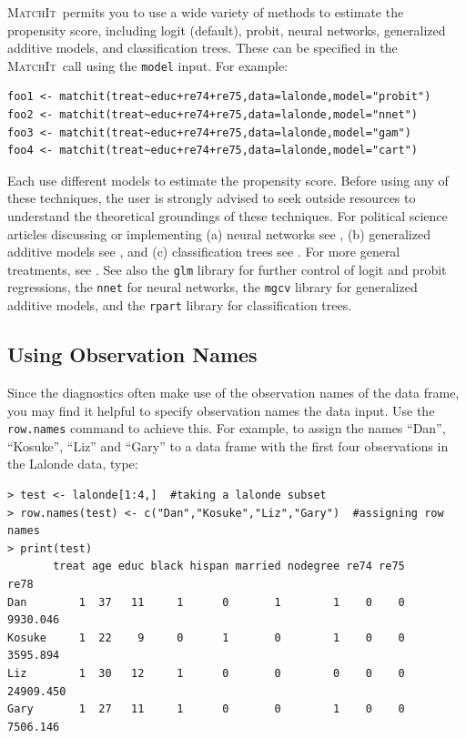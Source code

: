 \documentclass[oneside,letterpaper,titlepage]{article}
\newcommand{\MatchIt}{\textsc{MatchIt}}
\begin{document}
\MatchIt\ permits you to use a wide variety of methods to
estimate the propensity score, including logit (default), probit,
neural networks, generalized additive models, and classification
trees.  These can be specified in the \MatchIt\ call using the
\texttt{model} input.  For example:

\begin{verbatim}
foo1 <- matchit(treat~educ+re74+re75,data=lalonde,model="probit")
foo2 <- matchit(treat~educ+re74+re75,data=lalonde,model="nnet")
foo3 <- matchit(treat~educ+re74+re75,data=lalonde,model="gam")
foo4 <- matchit(treat~educ+re74+re75,data=lalonde,model="cart")
\end{verbatim}

Each use different models to estimate the propensity score.  Before
using any of these techniques, the user is strongly advised to seek
outside resources to understand the theoretical groundings of these
techniques.  For political science articles discussing or implementing
(a) neural networks see \citet{BecKinZen00,Zeng99,Zeng00,LagRus02}, (b)
generalized additive models see \citet{BecJac98}, and (c)
classification trees see \citet{RugKimMar03}.  For more general
treatments, see \citet{Bishop95,White92,BreFriOls84}.  See also the
\texttt{glm} library for further control of logit and probit
regressions, the \texttt{nnet} for neural networks, the \texttt{mgcv}
library for generalized additive models, and the \texttt{rpart}
library for classification trees.

\subsection{Using Observation Names}
\label{rnames}

Since the diagnostics often make use of the observation names of the
data frame, you may find it helpful to specify observation names the
data input.  Use the \texttt{row.names} command to achieve this.  For
example, to assign the names ``Dan'', ``Kosuke'', ``Liz'' and ``Gary''
to a data frame with the first four observations in the Lalonde data,
type:

\begin{verbatim}
> test <- lalonde[1:4,]  #taking a lalonde subset
> row.names(test) <- c("Dan","Kosuke","Liz","Gary")  #assigning row names
> print(test)
       treat age educ black hispan married nodegree re74 re75      re78
Dan        1  37   11     1      0       1        1    0    0  9930.046
Kosuke     1  22    9     0      1       0        1    0    0  3595.894
Liz        1  30   12     1      0       0        0    0    0 24909.450
Gary       1  27   11     1      0       0        1    0    0  7506.146
\end{verbatim} 
\end{document}
